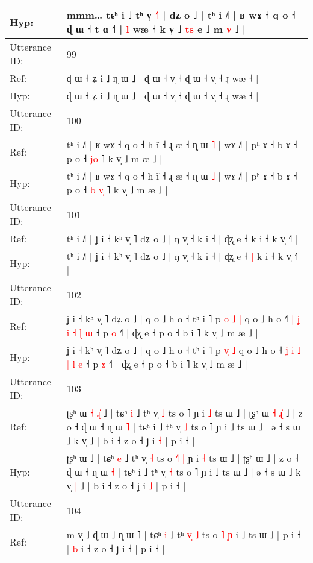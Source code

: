 \documentclass[10pt]{article}
\DeclareRobustCommand{\hl}[1]{{\textcolor{red}{#1}}}
\begin{document}
\begin{longtable}{ll}
Hyp: & mmm… tɕʰ i ˩ tʰ v̩ \hl{˧}˥ | dʑ o ˩ | tʰ i ˩˥ | ʁ wɤ ˧ q o ˧ ɖ ɯ ˧ t ɑ ˧˥ | \hl{l} wæ ˧ k v̩ ˩ \hl{t}\hl{s} e ˩ m \hl{v}\hl{̩} ˩ |
 \\
\midrule
Utterance ID: & 99 \\
Ref: & ɖ ɯ ˧ ʑ i ˩ ɳ ɯ ˩ | ɖ ɯ ˧ v̩ ˧ ɖ ɯ ˧ v̩ ˧ ɻ wæ ˧ |
 \\
Hyp: & ɖ ɯ ˧ ʑ i ˩ ɳ ɯ ˩ | ɖ ɯ ˧ v̩ ˧ ɖ ɯ ˧ v̩ ˧ ɻ wæ ˧ |
 \\
\midrule
Utterance ID: & 100 \\
Ref: & tʰ i ˩˥ | ʁ wɤ ˧ q o ˧ h ĩ ˧ ɻ æ ˧ ɳ ɯ \hl{˥} | wɤ ˩˥ | pʰ ɤ ˧ b ɤ ˧ p o ˧\hl{}\hl{} \hl{j}\hl{o} ˥ k v̩ ˩ m æ ˩ |
 \\
Hyp: & tʰ i ˩˥ | ʁ wɤ ˧ q o ˧ h ĩ ˧ ɻ æ ˧ ɳ ɯ \hl{˩} | wɤ ˩˥ | pʰ ɤ ˧ b ɤ ˧ p o ˧\hl{ }\hl{b} \hl{v}\hl{̩} ˥ k v̩ ˩ m æ ˩ |
 \\
\midrule
Utterance ID: & 101 \\
Ref: & tʰ i ˩˥ | ʝ i ˧ kʰ v̩ ˥ dʑ o ˩ | ŋ v̩ ˧ k i ˧ | ɖʐ e ˧\hl{}\hl{} k i ˧ k v̩ ˧˥ |
 \\
Hyp: & tʰ i ˩˥ | ʝ i ˧ kʰ v̩ ˥ dʑ o ˩ | ŋ v̩ ˧ k i ˧ | ɖʐ e ˧\hl{ }\hl{|} k i ˧ k v̩ ˧˥ |
 \\
\midrule
Utterance ID: & 102 \\
Ref: & ʝ i ˧ kʰ v̩ ˥ dʑ o ˩ | q o ˩ h o ˧ tʰ i ˥ p \hl{o}\hl{ }\hl{˩} \hl{|} q o ˩ h o ˧\hl{˥} \hl{|} \hl{ʝ} \hl{i} \hl{˧} \hl{ɭ} \hl{ɯ} ˧ p \hl{o} ˧˥ | ɖʐ e ˧ p o ˧ b i ˥ k v̩ ˩ m æ ˩ |
 \\
Hyp: & ʝ i ˧ kʰ v̩ ˥ dʑ o ˩ | q o ˩ h o ˧ tʰ i ˥ p \hl{}\hl{v}\hl{̩} \hl{˩} q o ˩ h o ˧\hl{} \hl{ʝ} \hl{i} \hl{˩} \hl{|} \hl{l} \hl{e} ˧ p \hl{ɤ} ˧˥ | ɖʐ e ˧ p o ˧ b i ˥ k v̩ ˩ m æ ˩ |
 \\
\midrule
Utterance ID: & 103 \\
Ref: & ʈʂʰ ɯ\hl{ }\hl{˧}\hl{ }\hl{ɻ}\hl{̍} ˩ | tɕʰ \hl{i} ˩ tʰ v̩ \hl{˩} ts o \hl{}˥\hl{}\hl{} ɲ i \hl{˩} ts ɯ ˩ | ʈʂʰ ɯ\hl{ }\hl{˧}\hl{ }\hl{ɻ}\hl{̍} ˩ | z o ˧ ɖ ɯ ˧ ɳ ɯ \hl{˥} | tɕʰ i ˩ tʰ v̩ \hl{˩} ts o ˥ ɲ i ˩ ts ɯ ˩ | ə ˧ s ɯ ˩ k v̩\hl{}\hl{} ˩ | b i ˧ z o ˧ ʝ i \hl{˧} | p i ˧ |
 \\
Hyp: & ʈʂʰ ɯ\hl{}\hl{}\hl{}\hl{}\hl{} ˩ | tɕʰ \hl{e} ˩ tʰ v̩ \hl{˧} ts o \hl{˧}˥\hl{ }\hl{|} ɲ i \hl{˧} ts ɯ ˩ | ʈʂʰ ɯ\hl{}\hl{}\hl{}\hl{}\hl{} ˩ | z o ˧ ɖ ɯ ˧ ɳ ɯ \hl{˧} | tɕʰ i ˩ tʰ v̩ \hl{˧} ts o ˥ ɲ i ˩ ts ɯ ˩ | ə ˧ s ɯ ˩ k v̩\hl{ }\hl{|} ˩ | b i ˧ z o ˧ ʝ i \hl{˩} | p i ˧ |
 \\
\midrule
Utterance ID: & 104 \\
Ref: & m v̩ ˩ ɖ ɯ ˩ ɳ ɯ \hl{}˥ | tɕʰ \hl{i} ˩ t\hl{}ʰ \hl{v}\hl{̩} \hl{˩} ts o\hl{}\hl{} \hl{˥} \hl{ɲ} i ˩ ts ɯ ˩ | p i ˧ | \hl{b} i ˧ z o ˧ ʝ i ˧ | p i ˧ |

\end{longtable}
\end{document}
